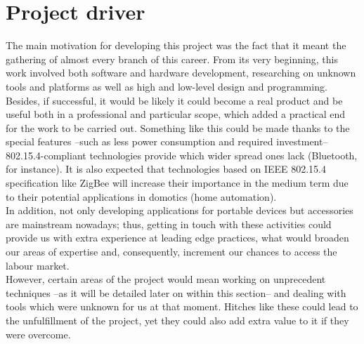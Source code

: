	\section{Project driver}
		The main motivation for developing this project was the fact that it meant
		the gathering of almost every branch of this career. From its very beginning, this
		work involved both software and hardware development, researching on unknown 
		tools and platforms as well as high and low-level design and programming.\\
		Besides, if successful, it would be likely it could become a real product
		and be useful both in a professional and particular scope, which added a practical
		end for the work to be carried out. Something like this could be made thanks to
		the special features --such as less power consumption and required investment-- 802.15.4-compliant
		technologies provide which wider spread ones lack (Bluetooth, for instance). It is also
		expected that technologies based on IEEE 802.15.4 specification like ZigBee will increase their
		importance in the medium term due to their potential applications in domotics (home automation).\\
		In addition, not only developing applications for portable devices but accessories
		are mainstream nowadays; thus, getting in touch with these activities could
		provide us with extra experience at leading edge practices, what would broaden our areas of
		expertise and, consequently, increment our chances to access the labour market.\\
		However, certain areas of the project would mean working on unprecedent techniques
		--as it will be detailed later on within this section-- and dealing with tools
		which were unknown for us at that moment. Hitches like these could lead to the
		unfulfillment of the project, yet they could also add extra value to it if 
		they were overcome.\\
		

